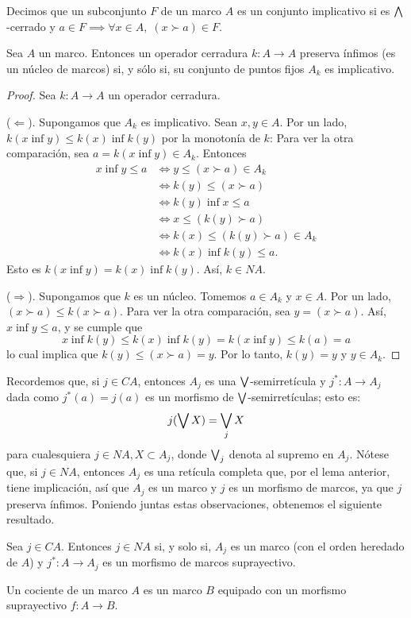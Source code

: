 \begin{definition}
Decimos que un subconjunto $F$ de un marco $A$ es un conjunto
implicativo si es $\bigwedge$-cerrado y
$a\in F \implies  \forall x \in A,\; (x\succ a)\in F$.
\end{definition}
\begin{lemma}
  Sea $A$ un marco. Entonces un operador cerradura $k:A\to A$
  preserva ínfimos (es un núcleo de marcos) si, y
  sólo si, su conjunto de puntos fijos $A_k$ es implicativo.
\end{lemma}
\begin{proof}
Sea $k:A\to A$ un operador cerradura.

($\Leftarrow$). Supongamos que $A_k$ es implicativo.
Sean $x,y \in A$.
Por un lado, $k(x\inf y)\leq k(x)\inf k(y)$ por la monotonía de $k$:
Para ver la otra comparación, sea $a=k(x\inf y)\in A_k$. Entonces
\begin{align*}
    x\inf y\leq a
    & \iff y\leq (x\succ a)\in A_k\\
    &\iff k(y)\leq (x\succ a)\\
    &\iff k(y)\inf x\leq a \\
    &\iff x\leq (k(y)\succ a) \\
    &\iff k(x)\leq (k(y)\succ a)\in A_k \\
    &\iff k(x)\inf k(y) \leq a.
\end{align*}
Esto es $k(x\inf y)=k(x)\inf k(y)$. Así, $k\in NA$.

($\Rightarrow$). Supongamos que $k$ es un núcleo. Tomemos $a\in A_k$ y
$x\in A$.
Por un lado, $(x\succ a)\leq k(x\succ a)$. Para ver la otra
comparación, sea $y=(x\succ a)$.
Así, $x\inf y\leq a$, y se cumple que 
$$x\inf k(y)\leq k(x)\inf k(y) =k(x\inf y)\leq k(a)=a$$
lo cual implica que $k(y)\leq (x\succ a)=y$. Por lo tanto, $k(y)=y$ y
$y\in A_k$.
\end{proof}

Recordemos que, si $j\in CA$, entonces $A_j$ es una $\bigvee$-semirretícula
y $j^*:A\to A_j$ dada como $j^*(a)=j(a)$
es un morfismo de $\bigvee$-semirretículas; esto es:
$$j(\bigvee X)=\bigvee_jX$$
para cualesquiera $j\in NA, X\subset A_j$, donde $\bigvee_j$ denota
al supremo en $A_j$.
Nótese que, si $j\in NA$, entonces $A_j$ es una retícula completa
que, por el lema anterior, tiene implicación, así que $A_j$ es un
marco y $j$ es un morfismo de marcos, ya que $j$ preserva
ínfimos.
Poniendo juntas estas observaciones, obtenemos el siguiente
resultado.
\begin{lemma}
    Sea $j\in CA$.
    Entonces $j\in NA$ si, y solo si,
    $A_j$ es un marco (con el orden heredado de $A$)
    y $j^*:A\to A_j$ es un morfismo de marcos suprayectivo.
\end{lemma}
\begin{definition}
  Un cociente de un marco $A$ es un marco $B$ equipado con un morfismo
  suprayectivo $f:A\to B$.
\end{definition}

